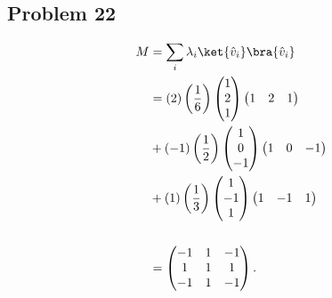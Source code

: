 \documentclass[10pt]{mypackage}
\begin{document}
\subsection{Problem 22}%
\begin{align*}
  M &= \sum_{i}\lambda_i \ket{\hat{v}_i}\bra{\hat{v}_i}\\
    &= \left(2\right)\left(\frac{1}{6}\right) \begin{pmatrix}1\\2\\1\end{pmatrix} \begin{pmatrix}1 & 2 & 1\end{pmatrix}\\
    &+ \left(-1\right)\left(\frac{1}{2}\right) \begin{pmatrix}1\\0\\-1\end{pmatrix} \begin{pmatrix}1 & 0 & -1\end{pmatrix}\\
    &+ \left(1\right)\left(\frac{1}{3}\right) \begin{pmatrix}1 \\ -1 \\ 1\end{pmatrix} \begin{pmatrix}1 & -1 & 1\end{pmatrix}\\
    \\
    &= \begin{pmatrix}-1 & 1 & -1 \\ 1 & 1 & 1 \\ -1 & 1 & -1\end{pmatrix}.
\end{align*}
\end{document}
